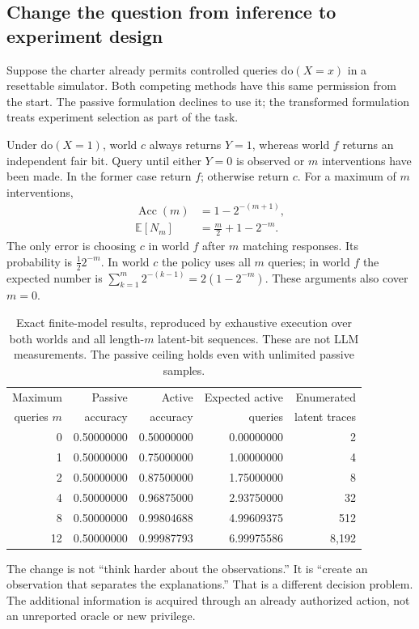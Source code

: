 \documentclass[11pt,letterpaper]{article}
\newcommand{\E}{\mathbb E}
\theoremstyle{remark}\newtheorem{remark}{Remark}[section]
\begin{document}
\subsection{Change the question from inference to experiment design}
Suppose the charter already permits controlled queries $\mathrm{do}(X=x)$ in a resettable simulator. Both competing methods have this same permission from the start. The passive formulation declines to use it; the transformed formulation treats experiment selection as part of the task.

Under $\mathrm{do}(X=1)$, world $c$ always returns $Y=1$, whereas world $f$ returns an independent fair bit. Query until either $Y=0$ is observed or $m$ interventions have been made. In the former case return $f$; otherwise return $c$. For a maximum of $m$ interventions,
\begin{align}
\operatorname{Acc}(m)&=1-2^{-(m+1)},\label{eq:accuracy}\\
\E[N_m]&=\frac m2+1-2^{-m}.\label{eq:queries}
\end{align}
The only error is choosing $c$ in world $f$ after $m$ matching responses. Its probability is $\tfrac12 2^{-m}$. In world $c$ the policy uses all $m$ queries; in world $f$ the expected number is $\sum_{k=1}^{m}2^{-(k-1)}=2(1-2^{-m})$. These arguments also cover $m=0$.

\begin{table}[htbp]
\centering\small
\caption{Exact finite-model results, reproduced by exhaustive execution over both worlds and all length-$m$ latent-bit sequences. These are not LLM measurements. The passive ceiling holds even with unlimited passive samples.}
\label{tab:exact}
\begin{tabular}{@{}rrrrr@{}}
\toprule
Maximum & Passive & Active & Expected active & Enumerated \\
queries $m$ & accuracy & accuracy & queries & latent traces \\
\midrule
0 & 0.50000000 & 0.50000000 & 0.00000000 & 2 \\
1 & 0.50000000 & 0.75000000 & 1.00000000 & 4 \\
2 & 0.50000000 & 0.87500000 & 1.75000000 & 8 \\
4 & 0.50000000 & 0.96875000 & 2.93750000 & 32 \\
8 & 0.50000000 & 0.99804688 & 4.99609375 & 512 \\
12 & 0.50000000 & 0.99987793 & 6.99975586 & 8,192 \\
\bottomrule
\end{tabular}
\end{table}
The change is not ``think harder about the observations.'' It is ``create an observation that separates the explanations.'' That is a different decision problem. The additional information is acquired through an already authorized action, not an unreported oracle or new privilege.
\end{document}
